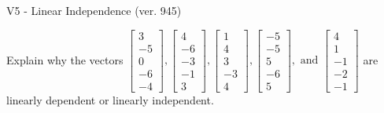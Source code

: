 \begin{exercise}
  \begin{exerciseTitle}V5 - Linear Independence (ver. 945)\end{exerciseTitle}
  \begin{exerciseStatement}
    Explain why the vectors \(\left[\begin{array}{r}
3 \\
-5 \\
0 \\
-6 \\
-4
\end{array}\right] , \left[\begin{array}{r}
4 \\
-6 \\
-3 \\
-1 \\
3
\end{array}\right] , \left[\begin{array}{r}
1 \\
4 \\
3 \\
-3 \\
4
\end{array}\right] , \left[\begin{array}{r}
-5 \\
-5 \\
5 \\
-6 \\
5
\end{array}\right] , \text{ and } \left[\begin{array}{r}
4 \\
1 \\
-1 \\
-2 \\
-1
\end{array}\right]\) are linearly dependent or linearly independent.	



\end{exerciseStatement}
\end{exercise}
